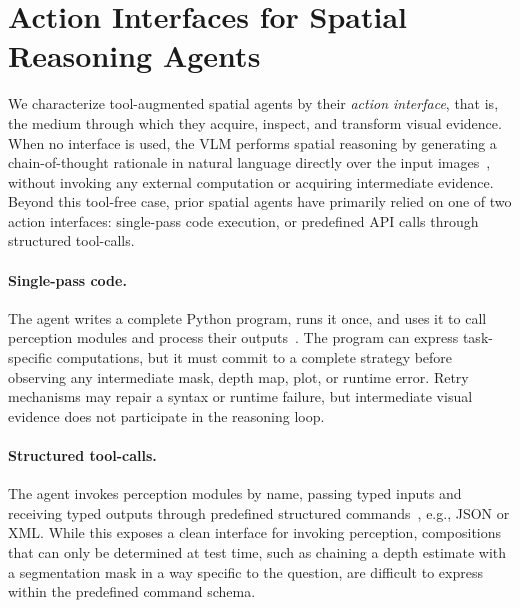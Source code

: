 \documentclass{llmxive}
\begin{document}
\section{Action Interfaces for Spatial Reasoning Agents}
\label{sec:interfaces}
\label{sec:code}

We characterize tool-augmented spatial agents by their \emph{action interface}, that is, the medium through which they acquire, inspect, and transform visual evidence.
When no interface is used, the VLM performs spatial reasoning by generating a chain-of-thought rationale in natural language directly over the input images~\citep{yang2024think,chen2025eagle2.5,qwen3.5,gemma4}, without invoking any external computation or acquiring intermediate evidence.
Beyond this tool-free case, prior spatial agents have primarily relied on one of two action interfaces: single-pass code execution, or predefined API calls through structured tool-calls.

\paragraph{Single-pass code.}
The agent writes a complete Python program, runs it once, and uses it to call perception modules and process their outputs~\citep{luo2026pyspatial,marsili2025visual}.
The program can express task-specific computations, but it must commit to a complete strategy before observing any intermediate mask, depth map, plot, or runtime error.
Retry mechanisms may repair a syntax or runtime failure, but intermediate visual evidence does not participate in the reasoning loop.

\paragraph{Structured tool-calls.}
The agent invokes perception modules by name, passing typed inputs and receiving typed outputs through predefined structured commands~\citep{chen2025geometrically,chen2025spacetools,ropero2026riemind}, e.g., JSON or XML.
While this exposes a clean interface for invoking perception, compositions that can only be determined at test time, such as chaining a depth estimate with a segmentation mask in a way specific to the question, are difficult to express within the predefined command schema.
\end{document}
